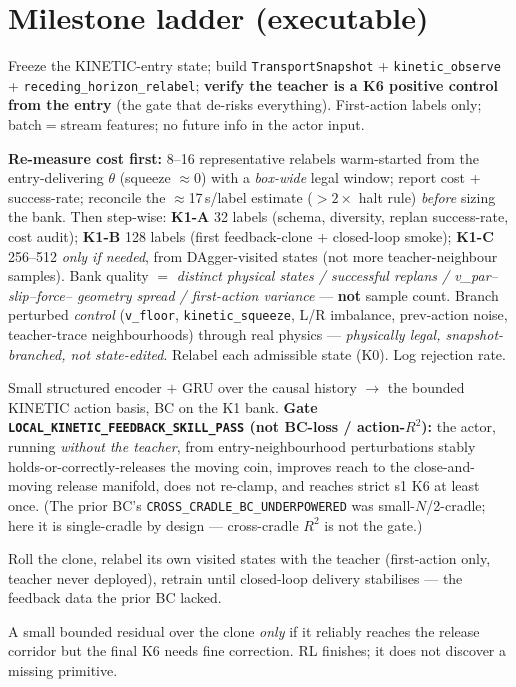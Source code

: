 \documentclass[11pt]{article}
\newcommand{\code}[1]{\texttt{\small #1}}
\begin{document}
\section{Milestone ladder (executable)}
\begin{description}[leftmargin=1.6em,style=nextline,nosep]
  \item[K0 --- snapshot \& expert contract \emph{(this change)}] Freeze the KINETIC-entry state; build
  \code{TransportSnapshot} + \code{kinetic\_observe} + \code{receding\_horizon\_relabel}; \textbf{verify the teacher is a
  K6 positive control from the entry} (the gate that de-risks everything). First-action labels only; batch$=$stream
  features; no future info in the actor input.
  \item[K1 --- local feedback bank (small, step-wise)] \textbf{Re-measure cost first:} 8--16 representative relabels
  warm-started from the entry-delivering $\theta$ (squeeze $\approx 0$) with a \emph{box-wide} legal window; report cost +
  success-rate; reconcile the $\approx$17\,s/label estimate ($>2\times$ halt rule) \emph{before} sizing the bank. Then
  step-wise: \textbf{K1-A} 32 labels (schema, diversity, replan success-rate, cost audit); \textbf{K1-B} 128 labels (first
  feedback-clone + closed-loop smoke); \textbf{K1-C} 256--512 \emph{only if needed}, from DAgger-visited states (not more
  teacher-neighbour samples). Bank quality $=$ \emph{distinct physical states / successful replans / v\_par--slip--force--
  geometry spread / first-action variance} --- \textbf{not} sample count. Branch perturbed \emph{control} (\code{v\_floor},
  \code{kinetic\_squeeze}, L/R imbalance, prev-action noise, teacher-trace neighbourhoods) through real physics ---
  \emph{physically legal, snapshot-branched, not state-edited}. Relabel each admissible state (K0). Log rejection rate.
  \item[K2 --- closed-loop clone] Small structured encoder $+$ GRU over the causal history $\to$ the bounded KINETIC
  action basis, BC on the K1 bank. \textbf{Gate \code{LOCAL\_KINETIC\_FEEDBACK\_SKILL\_PASS} (not BC-loss / action-$R^2$):}
  the actor, running \emph{without the teacher}, from entry-neighbourhood perturbations stably holds-or-correctly-releases the
  moving coin, improves reach to the close-and-moving release manifold, does not re-clamp, and reaches strict s1 K6 at least
  once. (The prior BC's \code{CROSS\_CRADLE\_BC\_UNDERPOWERED} was small-$N$/2-cradle; here it is single-cradle by design ---
  cross-cradle $R^2$ is not the gate.)
  \item[K3 --- DAgger / receding-horizon correction] Roll the clone, relabel its own visited states with the teacher
  (first-action only, teacher never deployed), retrain until closed-loop delivery stabilises --- the feedback data the
  prior BC lacked.
  \item[K4 --- bounded RL (only if needed)] A small bounded residual over the clone \emph{only} if it reliably reaches
  the release corridor but the final K6 needs fine correction. RL finishes; it does not discover a missing primitive.
\end{description}
\end{document}
